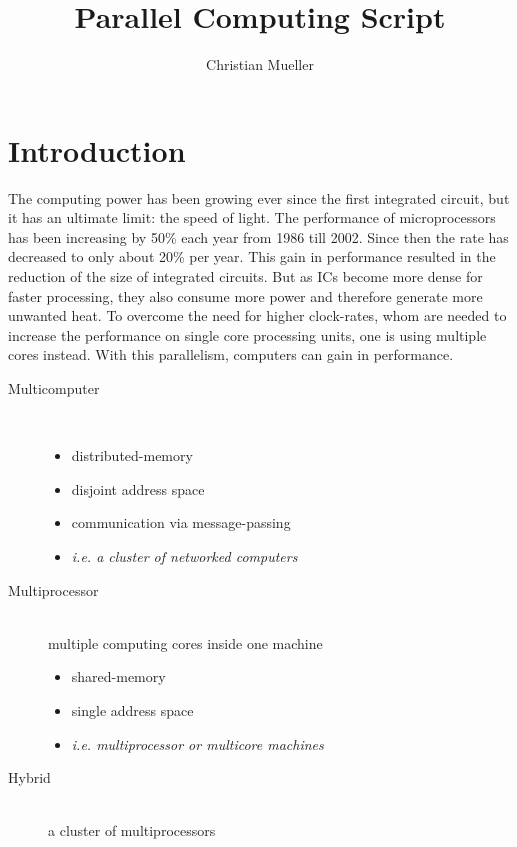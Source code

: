 \documentclass{article}
\author{Christian Mueller}
\title{Parallel Computing Script}
\begin{document}
\lstset{language=Perl,frame=L}

\maketitle
\tableofcontents

\section{Introduction} %
\label{sec:introduction}
	The computing power has been growing ever since the first integrated circuit,
	but it has an ultimate limit: the speed of light.
	The performance of microprocessors has been increasing by 50\% each year from 1986 till 2002.
	Since then the rate has decreased to only about 20\% per year.
	This gain in performance resulted in the reduction of the size of integrated circuits.
	But as ICs become more dense for faster processing,
	they also consume more power and therefore generate more unwanted heat.
	To overcome the need for higher clock-rates,
	whom are needed to increase the performance on single core processing units,
	one is using multiple cores instead.
	With this parallelism, computers can gain in performance.
	
 	\begin{description}
 		\item[Multicomputer] \hfill \\
 			\begin{itemize}
 				\item distributed-memory
 				\item disjoint address space
 				\item communication via message-passing
 				\item \textsl{i.e. a cluster of networked computers}
 			\end{itemize}
 		\item[Multiprocessor] \hfill \\
 			multiple computing cores inside one machine\\
 			\begin{itemize}
 				\item shared-memory
 				\item single address space
 				\item \textsl{i.e. multiprocessor or multicore machines}
 			\end{itemize}
 		\item[Hybrid] \hfill \\
 			a cluster of multiprocessors
	\end{description}
\end{document}
